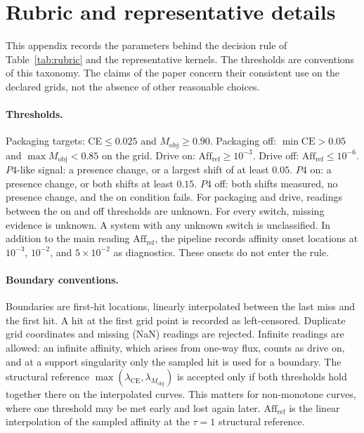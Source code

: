 \section{Rubric and representative details}
\label{app:metrics-rubric}

This appendix records the parameters behind the decision rule of Table~\ref{tab:rubric} and the representative kernels. The thresholds are conventions of this taxonomy. The claims of the paper concern their consistent use on the declared grids, not the absence of other reasonable choices.

\paragraph{Thresholds.} Packaging targets: CE${}\le0.025$ and $M_{\mathrm{obj}}\ge0.90$. Packaging off: $\min\mathrm{CE}>0.05$ and $\max M_{\mathrm{obj}}<0.85$ on the grid. Drive on: $\mathrm{Aff}_{\mathrm{ref}}\ge10^{-3}$. Drive off: $\mathrm{Aff}_{\mathrm{ref}}\le10^{-6}$. $P4$-like signal: a presence change, or a largest shift of at least $0.05$. $P4$ on: a presence change, or both shifts at least $0.15$. $P4$ off: both shifts measured, no presence change, and the on condition fails. For packaging and drive, readings between the on and off thresholds are unknown. For every switch, missing evidence is unknown. A system with any unknown switch is unclassified. In addition to the main reading $\mathrm{Aff}_{\mathrm{ref}}$, the pipeline records affinity onset locations at $10^{-3}$, $10^{-2}$, and $5\times10^{-2}$ as diagnostics. These onsets do not enter the rule.

\paragraph{Boundary conventions.} Boundaries are first-hit locations, linearly interpolated between the last miss and the first hit. A hit at the first grid point is recorded as left-censored. Duplicate grid coordinates and missing (NaN) readings are rejected. Infinite readings are allowed: an infinite affinity, which arises from one-way flux, counts as drive on, and at a support singularity only the sampled hit is used for a boundary. The structural reference $\max(\lambda_{\mathrm{CE}},\lambda_{M_{\mathrm{obj}}})$ is accepted only if both thresholds hold together there on the interpolated curves. This matters for non-monotone curves, where one threshold may be met early and lost again later. $\mathrm{Aff}_{\mathrm{ref}}$ is the linear interpolation of the sampled affinity at the $\tau=1$ structural reference.

